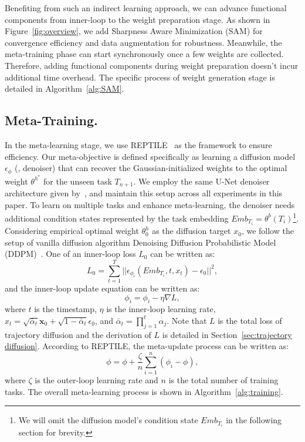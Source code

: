 Benefiting from such an indirect learning approach, we can advance functional components from inner-loop to the weight preparation stage. As shown in Figure~\ref{fig:overview}, we add Sharpness Aware Minimization (SAM) for convergence efficiency and data augmentation for robustness. Meanwhile, the meta-training phase can start synchronously once a few weights are collected. Therefore, adding functional components during weight preparation doesn't incur additional time overhead. The specific process of weight generation stage is detailed in Algorithm~\ref{alg:SAM}.
\\
\par
\subsection{Meta-Training.}
In the meta-learning stage, we use REPTILE~\cite{REPTILE} as the framework to ensure efficiency. Our meta-objective is defined specifically as learning a diffusion model $\epsilon_\phi$ (\ie, denoiser) that can recover the Gaussian-initialized weights to the optimal weight $\theta^{h^*}$ for the unseen task $T_{n+1}$. We employ the same U-Net denoiser architecture given by~\citet{stable_diffusion}, and maintain this setup across all experiments in this paper. To learn on multiple tasks and enhance meta-learning, the denoiser needs additional condition states represented by the task embedding $Emb_{T_i}=\theta^b(T_i)$\footnote{We will omit the diffusion model's condition state $Emb_{T_i}$ in the following section for brevity.}. Considering empirical optimal weight $\theta^h_0$ as the diffusion target $x_0$, we follow the setup of vanilla diffusion algorithm Denoising Diffusion Probabilistic Model (DDPM)~\cite{DDPM}. One of an inner-loop loss $L_0$ can be written as:
$$
    L_0=\sum_{t=1}^T||\epsilon_{\phi_i}(Emb_{T_i},t,x_t)-\epsilon_0||^2,
$$
and the inner-loop update equation can be written as:
$$
    \phi_i=\phi_i-\eta\nabla L,
$$
where $t$ is the timestamp, $\eta$ is the inner-loop learning rate, $x_t=\sqrt{\bar{\alpha}_t} \mathbf{x}_0 + \sqrt{1 - \bar{\alpha}_t}\epsilon_0$, and $\bar{\alpha}_t=\prod_{j=1}^t \alpha_j$. Note that $L$ is the total loss of trajectory diffusion and the derivation of $L$ is detailed in Section~\ref{sec:trajectory diffusion}. According to REPTILE, the meta-update process can be written as:
$$
\phi=\phi+\frac{\zeta}{n}\sum_{i=1}^n({\phi_i}-\phi),
$$
where $\zeta$ is the outer-loop learning rate and $n$ is the total number of training tasks. The overall meta-learning process is shown in Algorithm~\ref{alg:training}.
\\
\par

